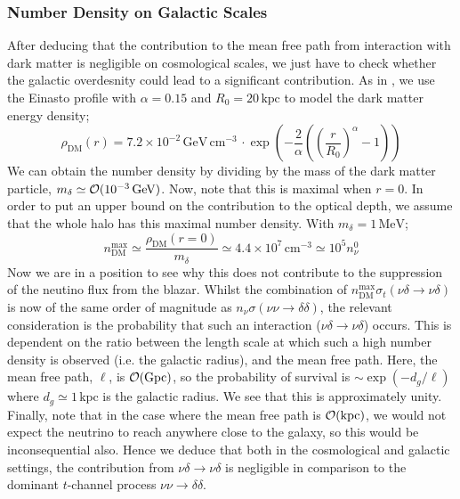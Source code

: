 \subsubsection{Number Density on Galactic Scales}
After deducing that the contribution to the mean free path from interaction with dark matter is negligible on cosmological scales, we just have to check whether the galactic overdesnity could lead to a significant contribution. As in \cite{Franarin2018}, we use the Einasto profile with $\alpha = 0.15$ and $R_0 = 20\,\textrm{kpc}$ to model the dark matter energy density;
\begin{equation}
  \rho_{\textrm{DM}}(r) = 7.2 \times 10^{-2}\,\textrm{GeV} \, \textrm{cm}^{-3}\, \cdot \exp\left(-\frac{2}{\alpha}\left(\left(\frac{r}{R_0}\right)^\alpha - 1\right)\right)
\end{equation}
We can obtain the number density by dividing by the mass of the dark matter particle, $m_\delta \simeq \mathcal{O}(10^{-3} \, \textrm{GeV})$. Now, note that this is maximal when $r = 0$. In order to put an upper bound on the contribution to the optical depth, we assume that the whole halo has this maximal number density. With $m_\delta = 1\, \textrm{MeV}$;
\begin{equation}
  n_{\textrm{DM}}^{\textrm{max}} \simeq \frac{\rho_{\textrm{DM}}(r = 0)}{m_\delta} \simeq 4.4 \times 10^{7} \, \textrm{cm}^{-3} \simeq 10^{5} n^0_{\nu}
\end{equation}
Now we are in a position to see why this does not contribute to the suppression of the neutino flux from the blazar. Whilst the combination of $n^{\textrm{max}}_{\textrm{DM}} \sigma_t(\nu\delta\rightarrow\nu\delta)$ is now of the same order of magnitude as $n_\nu \sigma(\nu\nu\rightarrow \delta\delta)$, the relevant consideration is the probability that such an interaction ($\nu\delta \rightarrow \nu\delta$) occurs. This is dependent on the ratio between the length scale at which such a high number density is observed (i.e. the galactic radius), and the mean free path. Here, the mean free path, $\ell$, is $\mathcal{O}(\textrm{Gpc})$, so the probability of survival is $\sim \exp(-d_{g}/\ell)$ where $d_g \simeq 1\,\textrm{kpc}$ is the galactic radius. We see that this is approximately unity. Finally, note that in the case where the mean free path is $\mathcal{O}(\textrm{kpc})$, we would not expect the neutrino to reach anywhere close to the galaxy, so this would be inconsequential also. Hence we deduce that both in the cosmological and galactic settings, the contribution from $\nu\delta \rightarrow \nu\delta$ is negligible in comparison to the dominant $t$-channel process $\nu\nu \rightarrow \delta\delta$.

